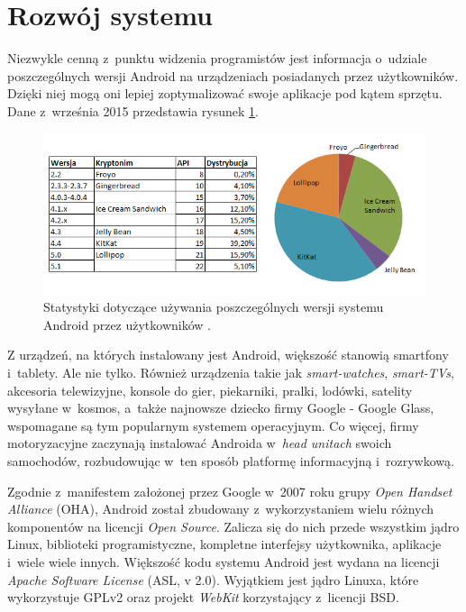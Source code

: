 \newpage

\section{Rozwój systemu}
Niezwykle cenną z~punktu widzenia programistów jest informacja o~udziale poszczególnych wersji Android na urządzeniach posiadanych przez użytkowników. Dzięki niej mogą oni lepiej zoptymalizować swoje aplikacje pod kątem sprzętu. Dane z~września 2015 przedstawia rysunek \ref{fig:android_udzial_wersje}.

\begin{figure}[!htb]
    \centering
    \includegraphics[width=17cm]{imgs/ch2_android_udzial_3pl.png}
    \caption
{Statystyki dotyczące używania poszczególnych wersji systemu Android przez użytkowników \cite{website:android:now}.}
    \label{fig:android_udzial_wersje}
\end{figure} 

Z urządzeń, na których instalowany jest Android, większość stanowią smartfony i~tablety. Ale nie tylko. Również urządzenia takie jak \textit{smart-watches}, \textit{smart-TVs}, akcesoria telewizyjne, konsole do gier, piekarniki, pralki, lodówki, satelity wysyłane w~kosmos, a~także najnowsze dziecko firmy Google - Google Glass, wspomagane są tym popularnym systemem operacyjnym. Co więcej, firmy motoryzacyjne zaczynają instalować Androida w~\textit{head unitach} swoich samochodów, rozbudowując w~ten sposób platformę informacyjną i~rozrywkową.

Zgodnie z~manifestem założonej przez Google w~2007 roku grupy \textit{Open Handset Alliance} (OHA), Android został zbudowany z~wykorzystaniem wielu różnych komponentów na licencji \textit{Open Source}. Zalicza się do nich przede wszystkim jądro Linux, biblioteki programistyczne, kompletne interfejsy użytkownika, aplikacje i~wiele wiele innych. Większość kodu systemu Android jest wydana na licencji \textit{Apache Software License} (ASL, v 2.0). Wyjątkiem jest jądro Linuxa, które wykorzystuje GPLv2 oraz projekt \textit{WebKit} korzystający z~licencji BSD. 

